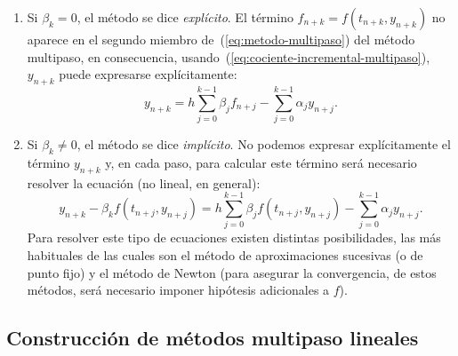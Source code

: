 \begin{enumerate}
\item Si $\beta_k=0$, el método se dice \emph{explícito}. El término
  $f_{n+k}=f(t_{n+k},y_{n+k})$ no aparece en el segundo miembro
  de~(\ref{eq:metodo-multipaso}) del método multipaso, en
  consecuencia, usando~(\ref{eq:cociente-incremental-multipaso}),
  $y_{n+k}$ puede expresarse explícitamente:
  \begin{equation*}
    y_{n+k}=  
    h\sum_{j=0}^{k-1} \beta_j f_{n+j}-\sum_{j=0}^{k-1}\alpha_j y_{n+j}.
  \end{equation*}
\item Si $\beta_k\neq 0$, el método se dice \emph{implícito}. No podemos
  expresar explícitamente el término $y_{n+k}$ y, en cada paso,
  para calcular este término será necesario resolver la ecuación (no
  lineal, en general):
  \begin{equation*}
    y_{n+k} - \beta_k f(t_{n+j},y_{n+j})= 
     h\sum_{j=0}^{k-1} \beta_j f(t_{n+j},y_{n+j})- \sum_{j=0}^{k-1}\alpha_j y_{n+j} .
  \end{equation*}
  Para resolver este tipo de ecuaciones existen distintas
  posibilidades, las más habituales de las cuales son el método de
  aproximaciones sucesivas (o de punto fijo) y el método de Newton
  (para asegurar la convergencia, de estos métodos, será necesario
  imponer hipótesis adicionales a $f$).
\end{enumerate}

\subsection*{Construcción de métodos multipaso lineales}

